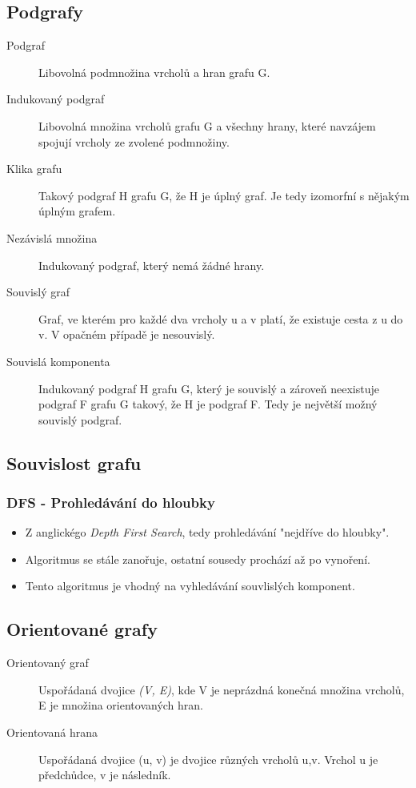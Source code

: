\documentclass{article}
\begin{document}
  \subsection{Podgrafy}

    \begin{description}
      \item[Podgraf] Libovolná podmnožina vrcholů a hran grafu G.
      \item[Indukovaný podgraf] Libovolná množina vrcholů grafu G a všechny hrany, které navzájem spojují vrcholy ze zvolené podmnožiny.
      \item[Klika grafu] Takový podgraf H grafu G, že H je úplný graf. Je tedy izomorfní s nějakým úplným grafem.
      \item[Nezávislá množina] Indukovaný podgraf, který nemá žádné hrany.
      \item[Souvislý graf] Graf, ve kterém pro každé dva vrcholy u a v platí, že existuje cesta z u do v. V opačném případě je nesouvislý.
      \item[Souvislá komponenta] Indukovaný podgraf H grafu G, který je souvislý a zároveň neexistuje podgraf F grafu G takový, že H je podgraf F. Tedy je největší možný souvislý podgraf.
    \end{description}

  \subsection{Souvislost grafu}

    \subsubsection{DFS - Prohledávání do hloubky}
      \begin{itemize}
        \item Z anglickégo \emph{Depth First Search}, tedy prohledávání "nejdříve do hloubky".
        \item Algoritmus se stále zanořuje, ostatní sousedy prochází až po vynoření.
        \item Tento algoritmus je vhodný na vyhledávání souvlislých komponent.
      \end{itemize}

  \subsection{Orientované grafy}

    \begin{description}
      \item[Orientovaný graf] Uspořádaná dvojice \emph{(V, E)}, kde V je neprázdná konečná množina vrcholů, E je množina orientovaných hran.
      \item[Orientovaná hrana] Uspořádaná dvojice (u, v) je dvojice různých vrcholů u,v. Vrchol u je předchůdce, v je následník.
    \end{description}
\end{document}
